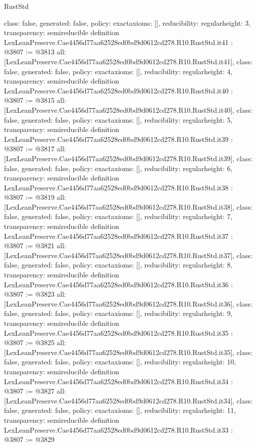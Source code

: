 \begin{lexlean}{RustStd}
\begin{coremodule}
{  class: false,
  generated: false,
  policy: exact{axioms: []},
  reducibility: regular{height: 3},
  transparency: semireducible
}
definition LexLeanPreserve.Cae4456d77aa62528ed0bd9d0612cd278.R10.RustStd.it41 : @3807 := @3813 {
  all: [LexLeanPreserve.Cae4456d77aa62528ed0bd9d0612cd278.R10.RustStd.it41],
  class: false,
  generated: false,
  policy: exact{axioms: []},
  reducibility: regular{height: 4},
  transparency: semireducible
}
definition LexLeanPreserve.Cae4456d77aa62528ed0bd9d0612cd278.R10.RustStd.it40 : @3807 := @3815 {
  all: [LexLeanPreserve.Cae4456d77aa62528ed0bd9d0612cd278.R10.RustStd.it40],
  class: false,
  generated: false,
  policy: exact{axioms: []},
  reducibility: regular{height: 5},
  transparency: semireducible
}
definition LexLeanPreserve.Cae4456d77aa62528ed0bd9d0612cd278.R10.RustStd.it39 : @3807 := @3817 {
  all: [LexLeanPreserve.Cae4456d77aa62528ed0bd9d0612cd278.R10.RustStd.it39],
  class: false,
  generated: false,
  policy: exact{axioms: []},
  reducibility: regular{height: 6},
  transparency: semireducible
}
definition LexLeanPreserve.Cae4456d77aa62528ed0bd9d0612cd278.R10.RustStd.it38 : @3807 := @3819 {
  all: [LexLeanPreserve.Cae4456d77aa62528ed0bd9d0612cd278.R10.RustStd.it38],
  class: false,
  generated: false,
  policy: exact{axioms: []},
  reducibility: regular{height: 7},
  transparency: semireducible
}
definition LexLeanPreserve.Cae4456d77aa62528ed0bd9d0612cd278.R10.RustStd.it37 : @3807 := @3821 {
  all: [LexLeanPreserve.Cae4456d77aa62528ed0bd9d0612cd278.R10.RustStd.it37],
  class: false,
  generated: false,
  policy: exact{axioms: []},
  reducibility: regular{height: 8},
  transparency: semireducible
}
definition LexLeanPreserve.Cae4456d77aa62528ed0bd9d0612cd278.R10.RustStd.it36 : @3807 := @3823 {
  all: [LexLeanPreserve.Cae4456d77aa62528ed0bd9d0612cd278.R10.RustStd.it36],
  class: false,
  generated: false,
  policy: exact{axioms: []},
  reducibility: regular{height: 9},
  transparency: semireducible
}
definition LexLeanPreserve.Cae4456d77aa62528ed0bd9d0612cd278.R10.RustStd.it35 : @3807 := @3825 {
  all: [LexLeanPreserve.Cae4456d77aa62528ed0bd9d0612cd278.R10.RustStd.it35],
  class: false,
  generated: false,
  policy: exact{axioms: []},
  reducibility: regular{height: 10},
  transparency: semireducible
}
definition LexLeanPreserve.Cae4456d77aa62528ed0bd9d0612cd278.R10.RustStd.it34 : @3807 := @3827 {
  all: [LexLeanPreserve.Cae4456d77aa62528ed0bd9d0612cd278.R10.RustStd.it34],
  class: false,
  generated: false,
  policy: exact{axioms: []},
  reducibility: regular{height: 11},
  transparency: semireducible
}
definition LexLeanPreserve.Cae4456d77aa62528ed0bd9d0612cd278.R10.RustStd.it33 : @3807 := @3829 {
}
\end{coremodule}
\end{lexlean}
